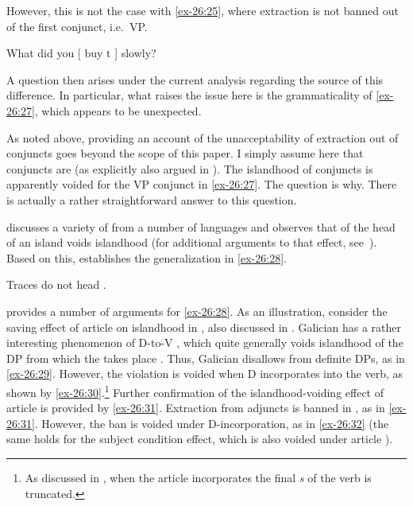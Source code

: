 \documentclass[output=paper]{langsci/langscibook}
\begin{document}
\ea\label{ex-26:26}
	\z
\z

However, this is not the case with \eqref{ex-26:25}, where extraction is not banned out of
the first conjunct, i.e.\ VP.

\ea\label{ex-26:27} What did you [ buy t ] slowly?
\z

A question then arises under the current analysis regarding the source of this
difference. In particular, what raises the issue here is the grammaticality of
\eqref{ex-26:27}, which appears to be unexpected.

As noted above, providing an account of the unacceptability of extraction out
of conjuncts goes beyond the scope of this paper. I simply assume here that
conjuncts are  (as explicitly also argued in \citealt{Oda:2017}). The
islandhood of conjuncts is apparently voided for the VP conjunct in \eqref{ex-26:27}. The
question is why. There is actually a rather straightforward answer to this
question.

\textcite{Boskovic2011,Boskovic2013b} discusses a variety of  from a
number of languages and observes that  of the head of an island voids
islandhood (for additional arguments to that effect,
see~\citealt{Boskovic2015}). Based on this, \citeauthor{Boskovic2015}
establishes the generalization in \eqref{ex-26:28}.

\ea\label{ex-26:28} Traces do not head .
\z

\textcite{Boskovic2013b} provides a number of arguments for \eqref{ex-26:28}. As an
illustration, consider the saving effect of article  on islandhood
in , also discussed in \textcite{Uriagereka1988,Uriagereka1996}.
Galician has a rather interesting phenomenon of D-to-V , which
quite generally voids islandhood of the DP from which the  takes
place \parencite[see][]{Uriagereka1988,Uriagereka1996,Boskovic2013b}. Thus,
Galician disallows  from definite DPs, as in \eqref{ex-26:29}. However, the
violation is voided when D incorporates into the verb, as shown by
\eqref{ex-26:30}.\footnote{As discussed in \citet{Uriagereka1988}, when the article
incorporates the final \emph{s} of the verb is truncated.} Further confirmation
of the islandhood-voiding effect of article  is provided by \eqref{ex-26:31}.
Extraction from adjuncts is banned in , as in \eqref{ex-26:31}.  However, the ban
is voided under D-incorporation, as in \eqref{ex-26:32} (the same holds for the subject
condition effect, which is also voided under article ).
\end{document}
